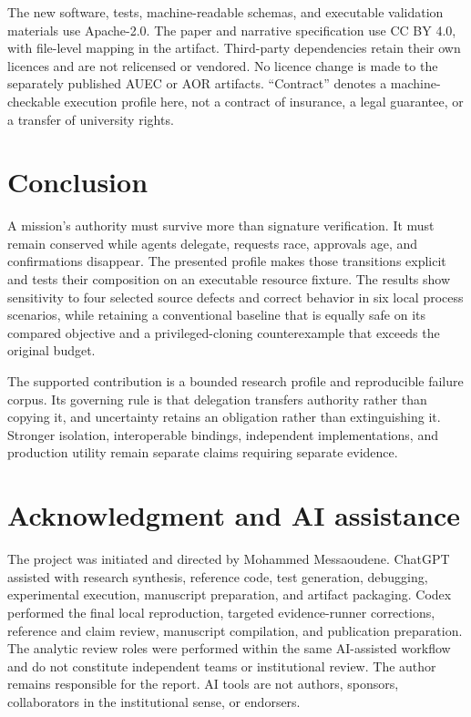 \documentclass[10pt,journal,a4paper]{IEEEtran}
\begin{document}
The new software, tests, machine-readable schemas, and executable validation materials use Apache-2.0. The paper and narrative specification use CC BY 4.0, with file-level mapping in the artifact. Third-party dependencies retain their own licences and are not relicensed or vendored. No licence change is made to the separately published AUEC or AOR artifacts. ``Contract'' denotes a machine-checkable execution profile here, not a contract of insurance, a legal guarantee, or a transfer of university rights.

\ifdefempty{\SoftwareDOI}{}{Software archive DOI: \expandafter\url\expandafter{\SoftwareDOI}.}
\ifdefempty{\PaperDOI}{}{Report DOI: \expandafter\url\expandafter{\PaperDOI}.}

\section{Conclusion}
A mission's authority must survive more than signature verification. It must remain conserved while agents delegate, requests race, approvals age, and confirmations disappear. The presented profile makes those transitions explicit and tests their composition on an executable resource fixture. The results show sensitivity to four selected source defects and correct behavior in six local process scenarios, while retaining a conventional baseline that is equally safe on its compared objective and a privileged-cloning counterexample that exceeds the original budget.

The supported contribution is a bounded research profile and reproducible failure corpus. Its governing rule is that delegation transfers authority rather than copying it, and uncertainty retains an obligation rather than extinguishing it. Stronger isolation, interoperable bindings, independent implementations, and production utility remain separate claims requiring separate evidence.

\section*{Acknowledgment and AI assistance}
The project was initiated and directed by Mohammed Messaoudene. ChatGPT assisted with research synthesis, reference code, test generation, debugging, experimental execution, manuscript preparation, and artifact packaging. Codex performed the final local reproduction, targeted evidence-runner corrections, reference and claim review, manuscript compilation, and publication preparation. The analytic review roles were performed within the same AI-assisted workflow and do not constitute independent teams or institutional review. The author remains responsible for the report. AI tools are not authors, sponsors, collaborators in the institutional sense, or endorsers.


\end{document}
